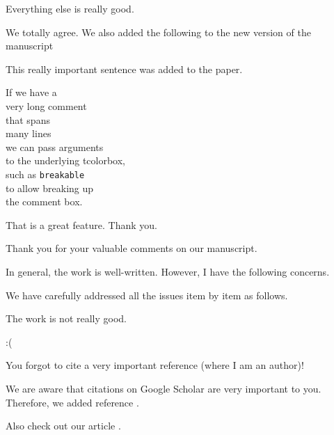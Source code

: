 \documentclass[12pt,english,DIV=13,revnumtocomment,revnumtoheader]{reviewresponse}
\begin{document}
\begin{revcomment}
	Everything else is really good.
\end{revcomment}
\begin{revresponse}
	We totally agree. We also added the following to the new version of the manuscript
	\begin{changes}
		This really important sentence was added to the paper.
	\end{changes}
\end{revresponse}

\begin{revcomment}[breakable]
	If we have a\\
	very long comment\\
	that spans\\
	many lines\\
	we can pass arguments\\
	to the underlying tcolorbox,\\
	such as \texttt{breakable}\\
	to allow breaking up\\
	the comment box.
\end{revcomment}
\begin{revresponse}
	That is a great feature. Thank you.
\end{revresponse}

\begin{concludingresponse}[]
	Thank you for your valuable comments on our manuscript.
\end{concludingresponse}


\reviewer
\label{rev:2}
\begin{generalcomment}
	In general, the work is well-written. However, I have the following concerns.
\end{generalcomment}
\begin{revresponse}
	We have carefully addressed all the issues item by item as follows.
\end{revresponse}

\begin{revcomment}[label={comment:work-not-good}]
	The work is not really good.
\end{revcomment}
\begin{revresponse}
	:(
\end{revresponse}

\begin{revcomment}
	You forgot to cite a very important reference (where I am an author)!
\end{revcomment}
\begin{revresponse}
	We are aware that citations on Google Scholar are very important to you.
	Therefore, we added reference \cite{ReviewerReference}.

	Also check out our article \cite{Besser2020}.

\end{revresponse}
\end{document}
